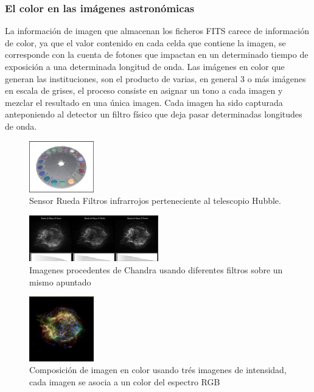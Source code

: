 	\subsubsection{El color en las imágenes astronómicas}
	La información de imagen que almacenan los ficheros FITS carece de información de color, ya que el valor contenido en cada celda que contiene la imagen, se corresponde con la cuenta de fotones que impactan en un determinado tiempo de exposición a una determinada longitud de onda. Las imágenes en color que generan las instituciones, son el producto de varias, en general 3 o más imágenes en escala de grises, el proceso consiste en asignar un tono a cada imagen y mezclar el resultado en una única imagen. Cada imagen ha sido capturada anteponiendo al detector un filtro físico que deja pasar determinadas longitudes de onda.
	\begin{figure}
		\centering
		\includegraphics[width=0.25\textwidth]{images/irfiltwheel_Hubble.jpg}
		\caption{\label{fig:irfiltwheel_Hubble}Sensor Rueda Filtros infrarrojos perteneciente al telescopio Hubble.}
	\end{figure}
	\begin{figure}
		\centering
		\includegraphics[width=0.5\textwidth]{images/Chandra-Compo-Images.jpg}
		\caption{\label{fig:Chandra Space Telescope Images}Imagenes procedentes de Chandra usando diferentes filtros sobre un mismo apuntado}
	\end{figure}
	\begin{figure}
		\centering
		\includegraphics[width=0.25\textwidth]{images/Chandra-Composed-Images.jpg}
		\caption{\label{fig:Chandra_Composed_Images}Composición de imagen en color usando trés imagenes de intensidad, cada imagen se asocia a un color del espectro RGB}
	\end{figure}

